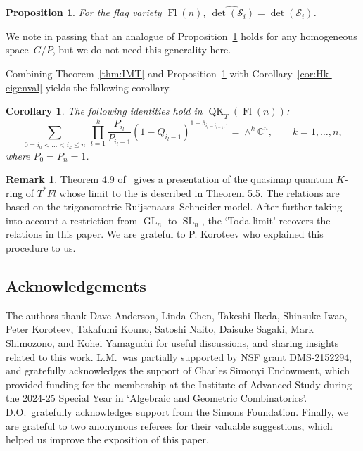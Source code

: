 \documentclass[pdftex]{sigma}
\numberwithin{equation}{section}
\newtheorem{Corollary}[Theorem]{Corollary}
\newtheorem{Proposition}[Theorem]{Proposition}
\theoremstyle{definition}
\newtheorem{Remark}[Theorem]{Remark}
\DeclareMathOperator{\GL}{GL}
\DeclareMathOperator{\SL}{SL}
\DeclareMathOperator{\Fl}{Fl}
\DeclareMathOperator{\QK}{QK}
\newcommand{\C}{{\mathbb C}}
\begin{document}
\begin{Proposition}\label{thm:ACTI-Kato} For the flag variety $\Fl(n)$,
$\widehat{\det(\mathcal{S}_i)}=\det(\mathcal{S}_i)$.
\end{Proposition}
We note in passing that an analogue of Proposition~\ref{thm:ACTI-Kato} holds for any homogeneous
space~$G/P$, but we do not need this generality here.

Combining Theorem~\ref{thm:IMT} and Proposition~\ref{thm:ACTI-Kato} with Corollary~\ref{cor:Hk-eigenval}
yields the following corollary.
\begin{Corollary}%
The following identities hold
in $\QK_T(\Fl(n))$:
\begin{equation*}
 \sum_{0= i_0<\dots<i_k\leq n}\ \prod_{l=1}^{k}\frac{P_{i_l}}{P_{i_{l}-1}}(1-Q_{i_l-1})^{1-\delta_{i_l-i_{l-1},1}}=\wedge^k \C^n,\qquad k=1,\dots,n,
\end{equation*}
where $P_0=P_n=1$.
\end{Corollary}

\begin{Remark}
Theorem 4.9 of~\cite{koroteev} gives a presentation of the quasimap quantum $K$-ring of $T^*Fl$ whose limit to the is described in Theorem 5.5. The relations are based on the trigonometric Ruijsenaars--Schneider model. After further taking into account a restriction from $\GL_n$ to $\SL_n$, the `Toda limit' recovers the relations in this paper. We are grateful to P. Koroteev who explained this procedure to us.
\end{Remark}

\subsection*{Acknowledgements}

The authors thank Dave Anderson, Linda Chen, Takeshi Ikeda, Shinsuke Iwao, Peter Koroteev, Takafumi Kouno, Satoshi Naito, Daisuke Sagaki, Mark Shimozono, and Kohei Yamaguchi for useful discussions, and sharing insights related to this work. L.M.\ was partially supported by NSF grant DMS-2152294, and gratefully acknowledges the support of Charles Simonyi Endowment, which provided funding for the membership at the Institute of Advanced Study during the 2024-25 Special Year in `Algebraic and Geometric Combinatorics'. D.O.\ gratefully acknowledges support from the Simons Foundation. Finally, we are grateful
to two anonymous referees for their valuable suggestions, which helped us improve the exposition of this paper.
\end{document}
